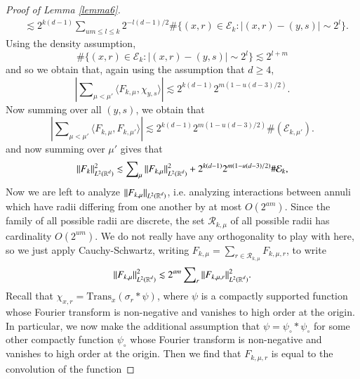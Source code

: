 \begin{proof}[Proof of Lemma \ref{lemma6}]
\begin{equation}
\begin{split}
        &\lesssim 2^{k(d-1)} \sum\nolimits_{um \leq l \leq k} 2^{-l(d-1)/2} \# \{ (x,r) \in \mathcal{E}_k: |(x,r) - (y,s)| \sim 2^l \}.
    \end{split}
    \end{equation}
    Using the density assumption,
    \begin{equation}
      \# \{ (x,r) \in \mathcal{E}_k: |(x,r) - (y,s)| \sim 2^l \} \lesssim 2^{l + m}
    \end{equation}
    and so we obtain that, again using the assumption that $d \geq 4$,
    \begin{equation}
      \left|\sum\nolimits_{\mu < \mu'} \langle F_{k,\mu}, \chi_{y,s} \rangle \right| \lesssim 2^{k(d-1)} 2^{m(1-u(d-3)/2)}.
    \end{equation}
    Now summing over all $(y,s)$, we obtain that
    \begin{equation}
      \left| \sum\nolimits_{\mu < \mu'} \langle F_{k,\mu}, F_{k,\mu'} \rangle \right| \lesssim 2^{k(d-1)} 2^{m(1 - u(d-3)/2)} \#(\mathcal{E}_{k,\mu'}).
    \end{equation}
    and now summing over $\mu'$ gives that
    \begin{equation}
      \| F_k \|_{L^2(\operatorname{\mathbb{R}}^d)}^2 \lesssim \sum\nolimits_\mu \| F_{k,\mu} \|_{L^2(\operatorname{\mathbb{R}}^d)}^2 + 2^{k(d-1)} 2^{m(1 - u(d-3)/2)} \# \mathcal{E}_k,
    \end{equation}
    Now we are left to analyze $\| F_{k,\mu} \|_{L^2(\operatorname{\mathbb{R}}^d)}$, i.e. analyzing interactions between annuli which have radii differing from one another by at most $O(2^{am})$. Since the family of all possible radii are discrete, the set $\mathcal{R}_{k,\mu}$ of all possible radii has cardinality $O(2^{um})$. We do not really have any orthogonality to play with here, so we just apply Cauchy-Schwartz, writing $F_{k,\mu} = \sum\nolimits_{r \in \mathcal{R}_{k,\mu}} F_{k,\mu,r}$, to write
    \begin{equation}
      \| F_{k,\mu} \|_{L^2(\operatorname{\mathbb{R}}^d)}^2 \lesssim 2^{am} \sum\nolimits_r \| F_{k,\mu,r} \|_{L^2(\operatorname{\mathbb{R}}^d)}^2.
    \end{equation}
    Recall that $\chi_{x,r} = \text{Trans}_x(\sigma_r * \psi)$, where $\psi$ is a compactly supported function whose Fourier transform is non-negative and vanishes to high order at the origin. In particular, we now make the additional assumption that $\psi = \psi_{\circ} * \psi_{\circ}$ for some other compactly function $\psi_{\circ}$ whose Fourier transform is non-negative and vanishes to high order at the origin. Then we find that $F_{k,\mu,r}$ is equal to the convolution of the function

\end{proof}
